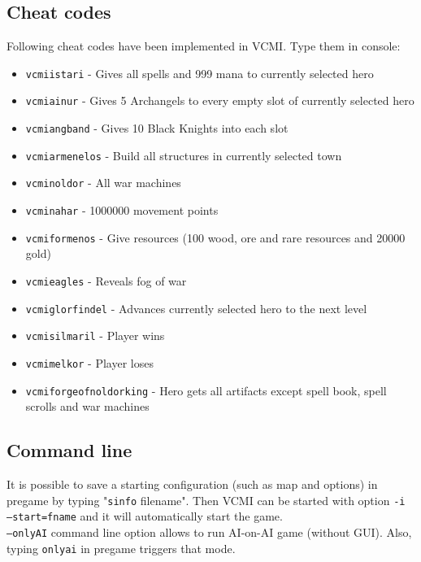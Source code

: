 \documentclass[a4size,final]{article}
\begin{document}
\subsection{Cheat codes}
Following cheat codes have been implemented in VCMI. Type them in console:
\begin{itemize}
\item \texttt{vcmiistari} - Gives all spells and 999 mana to currently selected hero
\item \texttt{vcmiainur} - Gives 5 Archangels to every empty slot of currently selected hero
\item \texttt{vcmiangband} - Gives 10 Black Knights into each slot
\item \texttt{vcmiarmenelos} - Build all structures in currently selected town
\item \texttt{vcminoldor} - All war machines
\item \texttt{vcminahar} - 1000000 movement points
\item \texttt{vcmiformenos} - Give resources (100 wood, ore and rare resources and 20000 gold)
\item \texttt{vcmieagles} - Reveals fog of war
\item \texttt{vcmiglorfindel} - Advances currently selected hero to the next level
\item \texttt{vcmisilmaril} - Player wins
\item \texttt{vcmimelkor} - Player loses
\item \texttt{vcmiforgeofnoldorking} - Hero gets all artifacts except spell book, spell scrolls and war machines
\end{itemize}
\subsection{Command line}
It is possible to save a starting configuration (such as map and options) in pregame by typing "\texttt{sinfo} filename". Then VCMI can be started with option \texttt{-i --start=fname} and it will automatically start the game.\\
\texttt{--onlyAI} command line option allows to run AI-on-AI game (without GUI). Also, typing \texttt{onlyai} in pregame triggers that mode.
\newpage
\end{document}

